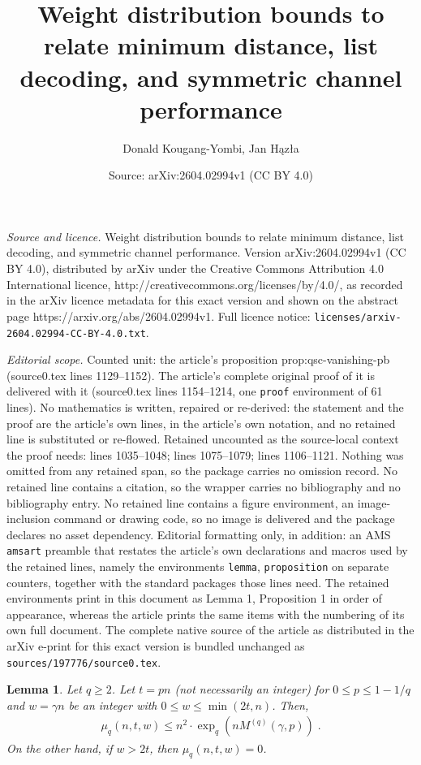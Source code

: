 \documentclass[10pt,a4paper]{amsart}
\title{Weight distribution bounds to relate minimum distance, list decoding, and symmetric channel performance}
\author{Donald Kougang-Yombi, Jan H{\k{a}}z{\l}a}
\date{Source: arXiv:2604.02994v1 (CC BY 4.0)}
\newtheorem{lemma}{Lemma}
\begin{document}
\maketitle

\noindent\emph{Source and licence.} Weight distribution bounds to relate minimum distance, list decoding, and symmetric channel performance. Version arXiv:2604.02994v1 (CC BY 4.0), distributed by arXiv under the Creative Commons Attribution 4.0 International licence, http://creativecommons.org/licenses/by/4.0/, as recorded in the arXiv licence metadata for this exact version and shown on the abstract page https://arxiv.org/abs/2604.02994v1. Full licence notice: \texttt{licenses/arxiv-2604.02994-CC-BY-4.0.txt}.\par\smallskip

\noindent\textit{Editorial scope.} Counted unit: the article's proposition prop:qsc-vanishing-pb (source0.tex lines 1129--1152). The article's complete original proof of it is delivered with it (source0.tex lines 1154--1214, one \texttt{proof} environment of 61 lines). No mathematics is written, repaired or re-derived: the statement and the proof are the article's own lines, in the article's own notation, and no retained line is substituted or re-flowed.  Retained uncounted as the source-local context the proof needs: lines 1035--1048; lines 1075--1079; lines 1106--1121.  Nothing was omitted from any retained span, so the package carries no omission record.  No retained line contains a citation, so the wrapper carries no bibliography and no bibliography entry.  No retained line contains a figure environment, an image-inclusion command or drawing code, so no image is delivered and the package declares no asset dependency.  Editorial formatting only, in addition: an AMS \texttt{amsart} preamble that restates the article's own declarations and macros used by the retained lines, namely the environments \texttt{lemma}, \texttt{proposition} on separate counters, together with the standard packages those lines need.  The retained environments print in this document as Lemma 1, Proposition 1 in order of appearance, whereas the article prints the same items with the numbering of its own full document.  The complete native source of the article as distributed in the arXiv e-print for this exact version is bundled unchanged as \texttt{sources/197776/source0.tex}.
\begin{lemma}
    \label{lem:qary_balls_intersection}
    Let $q\ge 2$.
    Let $t=p n$ (not necessarily an integer)
    for $0\le p\le 1-1/q$
    and $w=\gamma n$ be an integer
    with $0\le w\le \min(2t,n)$. Then,
\begin{align*}
\mu_q(n,t,w)\le n^2\cdot \exp_q\left(nM^{(q)}(\gamma,p)
\right)\;.
\end{align*}
On the other hand, if $w>2t$, then
$\mu_q(n,t,w)=0$.
\end{lemma}
\end{document}
